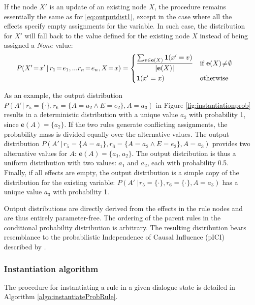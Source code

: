 If the node $X'$ is an update of an existing node $X$, the procedure remains essentially the same as for \eqref{eq:outputdist1}, except in the case where all the effects specify empty assignments for the variable. In such case, the distribution for $X'$ will fall back to the value defined for the existing node $X$ instead of being assigned a $\mathit{None}$ value:
\begin{align}
&P(X'\!=\!x' \, | \, r_1\!=\!e_1,... r_n\!=\!e_n, X\!=\!x) = \begin{dcases} 
\frac{\sum_{v \in {\mathbf{e}(X)}} \mathbf{1}(x' = v)} { |\mathbf{e}(X)| }  & \text{if } \mathbf{e}(X)\!\neq\!\emptyset \\
\mathbf{1}(x' = x) & \text{otherwise}
\end{dcases}\label{eq:outputdist2}
\end{align}

As an example, the output distribution $P(A' \, | \, r_5\!=\!\{\cdot\},r_6\!=\!\{A\!=\!a_2 \land E\!=\!e_2\}, A\!=\!a_3)$ in Figure \ref{fig:instantiationprob} results in a deterministic distribution with a unique value $a_2$ with probability 1, since $\mathbf{e}(A) = \{a_2\}$. If the two rules generate conflicting assignments, the probability mass is divided equally over the alternative values. The output distribution $P(A' \, | \, r_5\!=\!\{A\!=\!a_1\},r_6\!=\!\{A\!=\!a_2 \land E\!=\!e_2\}, A\!=\!a_3)$ provides two alternative values for $A$: $\mathbf{e}(A) = \{a_1,a_2\}$. The output distribution is thus a uniform distribution with two values: $a_1$ and $a_2$, each with probability 0.5. Finally, if all effects are empty, the output distribution is a simple copy of the distribution for the existing variable: $P(A' \, | \, r_5\!=\!\{\cdot\},r_6\!=\!\{\cdot\}, A\!=\!a_3)$ has a unique value $a_3$ with probability 1. 

Output distributions are directly derived from the effects in the rule nodes and are thus entirely parameter-free.  The ordering of the parent rules in the conditional probability distribution is arbitrary. The resulting distribution bears resemblance to the probabilistic Independence of Causal Influence (pICI) described by \cite{diez06}. 


\subsubsection*{Instantiation algorithm} 
\label{sec:utilruleinstantiation}

The procedure for instantiating a rule in a given dialogue state is detailed in Algorithm \ref{algo:instantiateProbRule}. 

